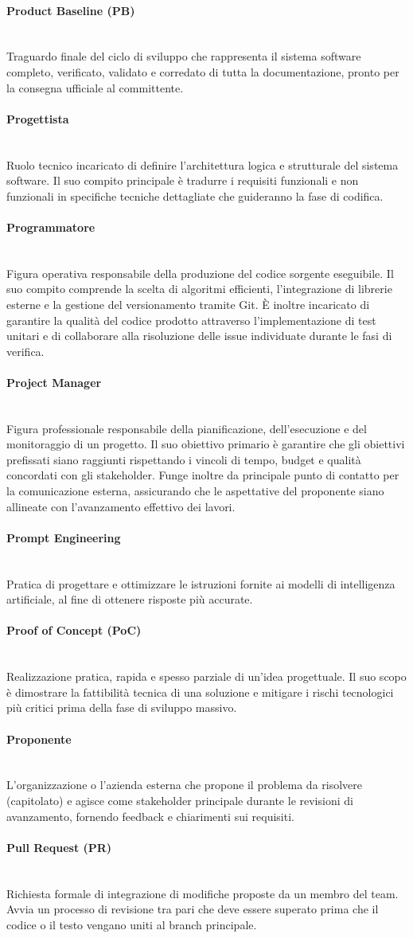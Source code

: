 \documentclass[a4paper, 10pt, colorlinks=true, linkcolor=black, urlcolor=blue, citecolor=blue, hidelinks]{article}
\newcommand{\glossaryterm}[2]{
    \paragraph{#1 \label{term:#1}} \mbox{} \\
    #2
    \vspace{0.5em}
}
\begin{document}
\glossaryterm{Product Baseline (PB)}{Traguardo finale del ciclo di sviluppo che rappresenta il sistema software completo, verificato, validato e corredato di tutta la documentazione, pronto per la consegna ufficiale al committente.}

\glossaryterm{Progettista}{Ruolo tecnico incaricato di definire l'architettura logica e strutturale del sistema software. Il suo compito principale è tradurre i requisiti funzionali e non funzionali in specifiche tecniche dettagliate che guideranno la fase di codifica.}

\glossaryterm{Programmatore}{Figura operativa responsabile della produzione del codice sorgente eseguibile. Il suo compito comprende la scelta di algoritmi efficienti, l'integrazione di librerie esterne e la gestione del versionamento tramite Git. È inoltre incaricato di garantire la qualità del codice prodotto attraverso l'implementazione di test unitari e di collaborare alla risoluzione delle issue individuate durante le fasi di verifica.}

\glossaryterm{Project Manager}{Figura professionale responsabile della pianificazione, dell'esecuzione e del monitoraggio di un progetto. Il suo obiettivo primario è garantire che gli obiettivi prefissati siano raggiunti rispettando i vincoli di tempo, budget e qualità concordati con gli stakeholder. Funge inoltre da principale punto di contatto per la comunicazione esterna, assicurando che le aspettative del proponente siano allineate con l'avanzamento effettivo dei lavori.}

\glossaryterm{Prompt Engineering}{Pratica di progettare e ottimizzare le istruzioni fornite ai modelli di intelligenza artificiale, al fine di ottenere risposte più accurate.}

\glossaryterm{Proof of Concept (PoC)}{Realizzazione pratica, rapida e spesso parziale di un'idea progettuale. Il suo scopo è dimostrare la fattibilità tecnica di una soluzione e mitigare i rischi tecnologici più critici prima della fase di sviluppo massivo.}

\glossaryterm{Proponente}{L'organizzazione o l'azienda esterna che propone il problema da risolvere (capitolato) e agisce come stakeholder principale durante le revisioni di avanzamento, fornendo feedback e chiarimenti sui requisiti.}

\glossaryterm{Pull Request (PR)}{Richiesta formale di integrazione di modifiche proposte da un membro del team. Avvia un processo di revisione tra pari che deve essere superato prima che il codice o il testo vengano uniti al branch principale.}
\end{document}
